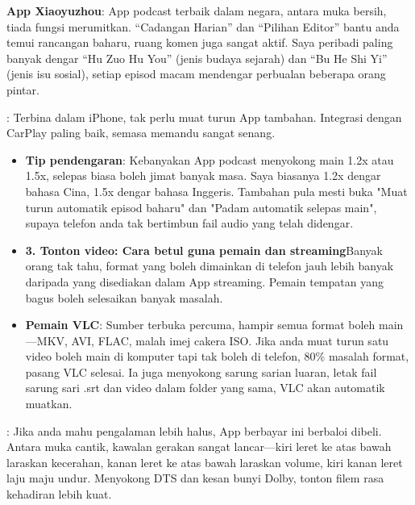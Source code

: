 \textbf{App Xiaoyuzhou}: App podcast terbaik dalam negara, antara muka bersih, tiada fungsi merumitkan. “Cadangan Harian” dan “Pilihan Editor” bantu anda temui rancangan baharu, ruang komen juga sangat aktif. Saya peribadi paling banyak dengar “Hu Zuo Hu You” (jenis budaya sejarah) dan “Bu He Shi Yi” (jenis isu sosial), setiap episod macam mendengar perbualan beberapa orang pintar.


: Terbina dalam iPhone, tak perlu muat turun App tambahan. Integrasi dengan CarPlay paling baik, semasa memandu sangat senang.

\begin{itemize}
  \item \textbf{Tip pendengaran}: Kebanyakan App podcast menyokong main 1.2x atau 1.5x, selepas biasa boleh jimat banyak masa. Saya biasanya 1.2x dengar bahasa Cina, 1.5x dengar bahasa Inggeris. Tambahan pula mesti buka "Muat turun automatik episod baharu" dan "Padam automatik selepas main", supaya telefon anda tak bertimbun fail audio yang telah didengar.
  \item \textbf{3. Tonton video: Cara betul guna pemain dan streaming}Banyak orang tak tahu, format yang boleh dimainkan di telefon jauh lebih banyak daripada yang disediakan dalam App streaming. Pemain tempatan yang bagus boleh selesaikan banyak masalah.
  \item \textbf{Pemain VLC}: Sumber terbuka percuma, hampir semua format boleh main—MKV, AVI, FLAC, malah imej cakera ISO. Jika anda muat turun satu video boleh main di komputer tapi tak boleh di telefon, 80\% masalah format, pasang VLC selesai. Ia juga menyokong sarung sarian luaran, letak fail sarung sari .srt dan video dalam folder yang sama, VLC akan automatik muatkan.
\end{itemize}


: Jika anda mahu pengalaman lebih halus, App berbayar ini berbaloi dibeli. Antara muka cantik, kawalan gerakan sangat lancar—kiri leret ke atas bawah laraskan kecerahan, kanan leret ke atas bawah laraskan volume, kiri kanan leret laju maju undur. Menyokong DTS dan kesan bunyi Dolby, tonton filem rasa kehadiran lebih kuat.

